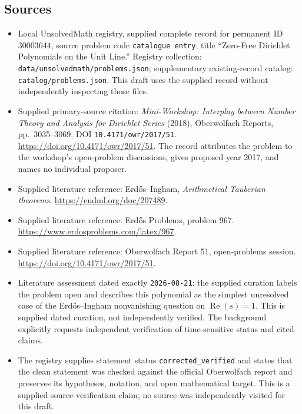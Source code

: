 \documentclass[11pt]{article}
\begin{document}
\subsection{Sources}
\begin{itemize}
\item Local UnsolvedMath registry, supplied complete record for permanent ID \(30003644\), source problem code \texttt{catalogue entry}, title ``Zero-Free Dirichlet Polynomials on the Unit Line.'' Registry collection: \texttt{data/unsolvedmath/problems.json}; supplementary existing-record catalog: \texttt{catalog/problems.json}. This draft uses the supplied record without independently inspecting those files.
\item Supplied primary-source citation: \emph{Mini-Workshop: Interplay between Number Theory and Analysis for Dirichlet Series} (2018), Oberwolfach Reports, pp.~3035--3069, DOI \texttt{10.4171/owr/2017/51}. \url{https://doi.org/10.4171/owr/2017/51}. The record attributes the problem to the workshop's open-problem discussions, gives proposed year 2017, and names no individual proposer.
\item Supplied literature reference: Erd\H{o}s--Ingham, \emph{Arithmetical Tauberian theorems}. \url{https://eudml.org/doc/207489}.
\item Supplied literature reference: Erd\H{o}s Problems, problem 967. \url{https://www.erdosproblems.com/latex/967}.
\item Supplied literature reference: Oberwolfach Report 51, open-problems session. \url{https://doi.org/10.4171/owr/2017/51}.
\item Literature assessment dated exactly \texttt{2026-08-21}: the supplied curation labels the problem open and describes this polynomial as the simplest unresolved case of the Erd\H{o}s--Ingham nonvanishing question on \(\operatorname{Re}(s)=1\). This is supplied dated curation, not independently verified. The background explicitly requests independent verification of time-sensitive status and cited claims.
\item The registry supplies statement status \texttt{corrected\_verified} and states that the clean statement was checked against the official Oberwolfach report and preserves its hypotheses, notation, and open mathematical target. This is a supplied source-verification claim; no source was independently visited for this draft.
\end{itemize}
\end{document}
